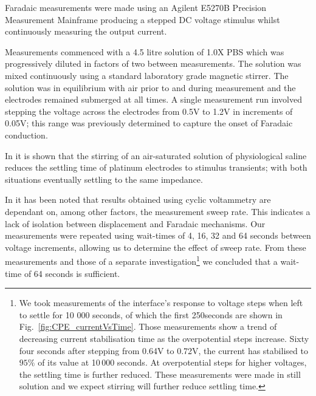 \documentclass[journal, a4paper]{IEEEtran}
\begin{document}
Faradaic measurements were made using an Agilent E5270B Precision Measurement Mainframe producing a stepped DC voltage stimulus whilst continuously measuring the output current.

Measurements commenced with a 4.5 litre solution of 1.0X PBS which was progressively diluted in factors of two between measurements. The solution was mixed continuously using a standard laboratory grade magnetic stirrer. The solution was in equilibrium with air prior to and during measurement and the electrodes remained submerged at all times.
A single measurement run involved stepping the voltage across the electrodes from 0.5\thinspace V to 1.2\thinspace V in increments of 0.05\thinspace V; this range was previously determined to capture the onset of Faradaic conduction.

In \cite{Greatbatch1969} it is shown that the stirring of an air-saturated solution of physiological saline reduces the settling time of platinum electrodes to stimulus transients; with both situations eventually settling to the same impedance.

In \cite{Cogan2008} it has been noted that results obtained using cyclic voltammetry are dependant on, among other factors, the measurement sweep rate. This indicates a lack of isolation between displacement and Faradaic mechanisms. Our measurements were repeated using wait-times of 4, 16, 32 and 64 seconds between voltage increments, allowing us to determine the effect of sweep rate. From these measurements and those of a separate investigation\footnote{We took measurements of the interface's response to voltage steps when left to settle for 10 000 seconds, of which the first 250\thinspace seconds are shown in Fig.~\ref{fig:CPE_currentVsTime}. Those measurements show a trend of decreasing current stabilisation time as the overpotential steps increase. Sixty four seconds after stepping from 0.64\thinspace V to 0.72\thinspace V, the current has stabilised to $95\%$ of its value at 10\,000 seconds. At overpotential steps for higher voltages, the settling time is further reduced. These measurements were made in still solution and we expect stirring will further reduce settling time.} we concluded that a wait-time of 64 seconds is sufficient.
\end{document}
